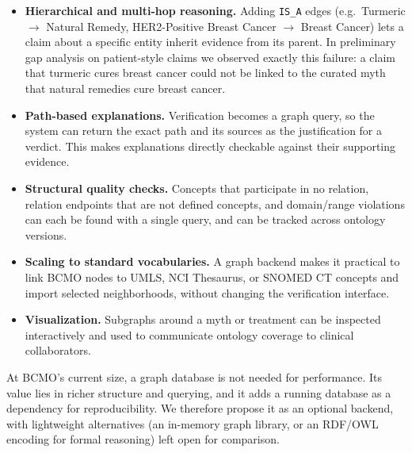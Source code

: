 \documentclass[10pt,a4paper]{article}
\begin{document}
\begin{itemize}[leftmargin=*,itemsep=1pt,topsep=2pt]
  \item \textbf{Hierarchical and multi-hop reasoning.} Adding \texttt{IS\_A} edges (e.g.\ Turmeric $\rightarrow$ Natural Remedy, HER2-Positive Breast Cancer $\rightarrow$ Breast Cancer) lets a claim about a specific entity inherit evidence from its parent. In preliminary gap analysis on patient-style claims we observed exactly this failure: a claim that turmeric cures breast cancer could not be linked to the curated myth that natural remedies cure breast cancer.
  \item \textbf{Path-based explanations.} Verification becomes a graph query, so the system can return the exact path and its sources as the justification for a verdict. This makes explanations directly checkable against their supporting evidence.
  \item \textbf{Structural quality checks.} Concepts that participate in no relation, relation endpoints that are not defined concepts, and domain/range violations can each be found with a single query, and can be tracked across ontology versions.
  \item \textbf{Scaling to standard vocabularies.} A graph backend makes it practical to link BCMO nodes to UMLS, NCI Thesaurus, or SNOMED CT concepts and import selected neighborhoods, without changing the verification interface.
  \item \textbf{Visualization.} Subgraphs around a myth or treatment can be inspected interactively and used to communicate ontology coverage to clinical collaborators.
\end{itemize}

At BCMO's current size, a graph database is not needed for performance. Its value lies in richer structure and querying, and it adds a running database as a dependency for reproducibility. We therefore propose it as an optional backend, with lightweight alternatives (an in-memory graph library, or an RDF/OWL encoding for formal reasoning) left open for comparison.

\newpage
\end{document}
